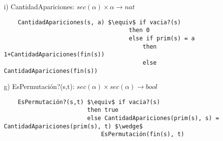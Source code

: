 i) CantidadApariciones: $sec(\alpha) \times \alpha \rightarrow nat$
\begin{lstlisting}
    CantidadApariciones(s, a) $\equiv$ if vacia?(s)
                                    then 0
                                    else if prim(s) = a
                                        then 1+CantidadApariciones(fin(s))
                                        else CantidadApariciones(fin(s))
\end{lstlisting}

g) EsPermutación?(s,t): $sec(\alpha) \times sec(\alpha) \rightarrow bool$
\begin{lstlisting}
    EsPermutación?(s,t) $\equiv$ if vacia?(s)
                        then true
                        else CantidadApariciones(prim(s), s) = CantidadApariciones(prim(s), t) $\wedge$
                            EsPermutación(fin(s), t)
\end{lstlisting}


